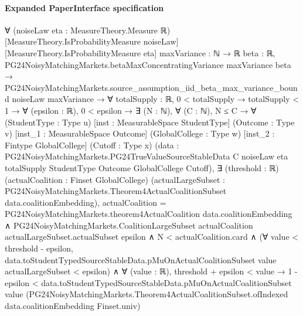 \documentclass[10pt]{article}
\begin{document}
\paragraph{Expanded PaperInterface specification}
\begin{ReviewVerbatim}
∀ (noiseLaw eta : MeasureTheory.Measure ℝ) [MeasureTheory.IsProbabilityMeasure noiseLaw]
  [MeasureTheory.IsProbabilityMeasure eta] {maxVariance : ℕ → ℝ} {beta : ℝ},
  PG24NoisyMatchingMarkets.betaMaxConcentratingVariance maxVariance beta →
    PG24NoisyMatchingMarkets.source_assumption_iid_beta_max_variance_bound noiseLaw maxVariance →
      ∀ {totalSupply : ℝ},
        0 < totalSupply →
          totalSupply < 1 →
            ∀ (epsilon : ℝ),
              0 < epsilon →
                ∃ (N : ℕ),
                  ∀ (C : ℕ),
                    N ≤ C →
                      ∀ (StudentType : Type u) [inst : MeasurableSpace StudentType] (Outcome : Type v)
                        [inst_1 : MeasurableSpace Outcome] (GlobalCollege : Type w) [inst_2 : Fintype GlobalCollege]
                        (Cutoff : Type x)
                        (data :
                          PG24NoisyMatchingMarkets.PG24TrueValueSourceStableData C noiseLaw eta totalSupply StudentType
                            Outcome GlobalCollege Cutoff),
                        ∃ (threshold : ℝ) (actualCoalition : Finset GlobalCollege) (actualLargeSubset :
                          PG24NoisyMatchingMarkets.Theorem4ActualCoalitionSubset data.coalitionEmbedding),
                          actualCoalition = PG24NoisyMatchingMarkets.theorem4ActualCoalition data.coalitionEmbedding ∧
                            PG24NoisyMatchingMarkets.CoalitionLargeSubset actualCoalition actualLargeSubset.actualSubset
                                epsilon ∧
                              N < actualCoalition.card ∧
                                (∀ value < threshold - epsilon,
                                    data.toStudentTypedSourceStableData.pMuOnActualCoalitionSubset value
                                        actualLargeSubset <
                                      epsilon) ∧
                                  ∀ (value : ℝ),
                                    threshold + epsilon < value →
                                      1 - epsilon <
                                        data.toStudentTypedSourceStableData.pMuOnActualCoalitionSubset value
                                          (PG24NoisyMatchingMarkets.Theorem4ActualCoalitionSubset.ofIndexed
                                            data.coalitionEmbedding Finset.univ)
\end{ReviewVerbatim}
\end{document}
